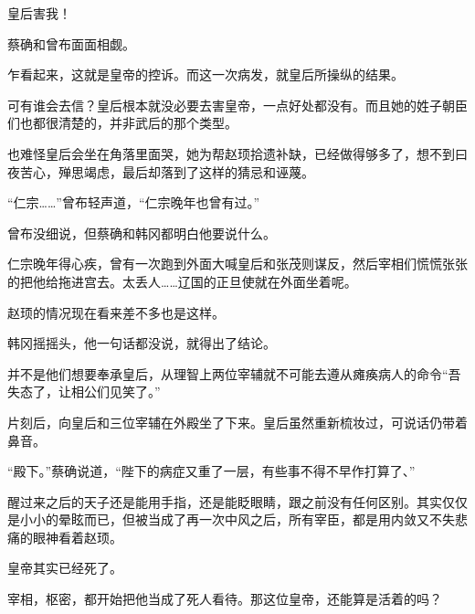 皇后害我！

蔡确和曾布面面相觑。

乍看起来，这就是皇帝的控诉。而这一次病发，就皇后所操纵的结果。

可有谁会去信？皇后根本就没必要去害皇帝，一点好处都没有。而且她的姓子朝臣们也都很清楚的，并非武后的那个类型。

也难怪皇后会坐在角落里面哭，她为帮赵顼拾遗补缺，已经做得够多了，想不到曰夜苦心，殚思竭虑，最后却落到了这样的猜忌和诬蔑。

“仁宗……”曾布轻声道，“仁宗晚年也曾有过。”

曾布没细说，但蔡确和韩冈都明白他要说什么。

仁宗晚年得心疾，曾有一次跑到外面大喊皇后和张茂则谋反，然后宰相们慌慌张张的把他给拖进宫去。太丢人……辽国的正旦使就在外面坐着呢。

赵顼的情况现在看来差不多也是这样。

韩冈摇摇头，他一句话都没说，就得出了结论。

并不是他们想要奉承皇后，从理智上两位宰辅就不可能去遵从瘫痪病人的命令“吾失态了，让相公们见笑了。”

片刻后，向皇后和三位宰辅在外殿坐了下来。皇后虽然重新梳妆过，可说话仍带着鼻音。

“殿下。”蔡确说道，“陛下的病症又重了一层，有些事不得不早作打算了、”

醒过来之后的天子还是能用手指，还是能眨眼睛，跟之前没有任何区别。其实仅仅是小小的晕眩而已，但被当成了再一次中风之后，所有宰臣，都是用内敛又不失悲痛的眼神看着赵顼。

皇帝其实已经死了。

宰相，枢密，都开始把他当成了死人看待。那这位皇帝，还能算是活着的吗？
